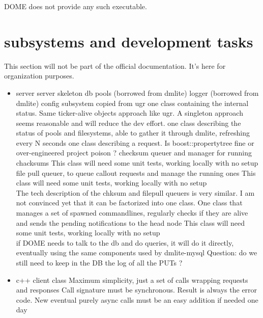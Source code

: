 \documentclass[a4paper,10pt]{scrreprt}
\begin{document}
DOME does not provide any such executable.\\

\chapter{subsystems and development tasks}
This section will not be part of the official documentation. It's here for organization purposes.\\

\begin{itemize}
 \item server
 \subitem server skeleton
 \subitem db pools (borrowed from dmlite)
 \subitem logger (borrowed from dmlite)
 \subitem config subsystem copied from ugr
 \subitem one class containing the internal status. Same ticker-alive objects approach like ugr. A singleton approach seems reasonable and will reduce the dev effort.
 \subsubitem one class describing the status of pools and filesystems, able to gather it through dmlite, refreshing every N seconds
 \subitem one class describing a request. Is boost::propertytree fine or over-engineered project poison ?
 \subitem checksum queuer and manager for running chacksums
  This class will need some unit tests, working locally with no setup\\
  
 \subitem file pull queuer, to queue callout requests and manage the running ones
 This class will need some unit tests, working locally with no setup\\
 
 The tech description of the chksum and filepull queuers is very similar. I am not convinced yet that it can be factorized into one class.
 \subitem One class that manages a set of spawned commandlines, regularly checks if they are alive and sends the pending notifications to the head node
 This class will need some unit tests, working locally with no setup\\
 
 \subitem if DOME needs to talk to the db and do queries, it will do it directly, eventually using the same components used by dmlite-mysql
 \subitem Question: do we still need to keep in the DB the log of all the PUTs ?
 
 \item c++ client class
 \subitem Maximum simplicity, just a set of calls wrapping requests and responses
 \subitem Call signature must be synchronous. Result is always the error code.
 \subitem New eventual purely async calls must be an easy addition if needed one day
 

\end{itemize}
\end{document}
